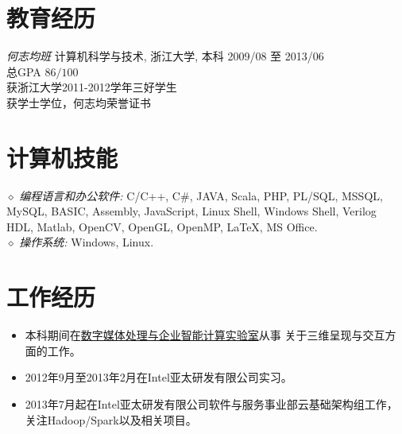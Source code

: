 \documentclass[line,margin]{res}
\begin{document}
\address{联系电话:\sl 15216861267}
\address{E-mail:\sl me@daoyuan.wang}


\begin{resume}



\section{教育经历} {\sl 何志均班} 计算机科学与技术, 浙江大学, 本科 \hfill 2009/08 至 2013/06\\
                总GPA $86/100$\\
                获浙江大学2011-2012学年三好学生\\
                获学士学位，何志均荣誉证书\\

\section{计算机技能} {$\diamond$ \sl 编程语言和办公软件:} C/C++, C\#, JAVA, Scala, PHP, PL/SQL, MSSQL, MySQL, BASIC, Assembly, JavaScript, Linux Shell, Windows Shell, Verilog HDL, Matlab, OpenCV, OpenGL, OpenMP, \LaTeX, MS Office. \\
                {$\diamond$ \sl 操作系统:} Windows, Linux.

\section{工作经历}
            \begin{itemize}
            \item 本科期间在\href{http://give.zju.edu.cn}{数字媒体处理与企业智能计算实验室}从事
                关于三维呈现与交互方面的工作。
            \item 2012年9月至2013年2月在Intel亚太研发有限公司实习。
            \item 2013年7月起在Intel亚太研发有限公司软件与服务事业部云基础架构组工作，关注Hadoop/Spark以及相关项目。
            \end{itemize}


\end{resume}
\end{document}
